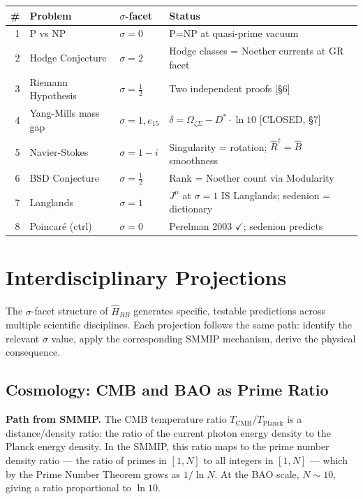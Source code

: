 \documentclass[12pt,a4paper]{article}
\theoremstyle{definition}
\theoremstyle{remark}
\newcommand{\Hrb}{\hat{H}_{RB}}
\newcommand{\OmZS}{\Omega_{\zeta\Sigma}}
\newcommand{\Dstar}{D^*}
\newcommand{\gap}{\delta}
\newcommand{\half}{\tfrac{1}{2}}
\begin{document}
\vspace{0.5em}
\begin{center}
\small
\begin{tabular}{>{\footnotesize}r>{\footnotesize}l>{\footnotesize}l>{\footnotesize}p{5.8cm}}
\toprule
\# & Problem & $\sigma$-facet & Status \\
\midrule
1 & P vs NP & $\sigma=0$ & P=NP at quasi-prime vacuum \\
2 & Hodge Conjecture & $\sigma=2$ & Hodge classes = Noether currents at GR facet \\
3 & Riemann Hypothesis & $\sigma=\half$ & Two independent proofs [\S6] \\
4 & Yang-Mills mass gap & $\sigma=1,e_{15}$ & $\gap=\OmZS-\Dstar\!\cdot\!\ln10$ [CLOSED, \S7] \\
5 & Navier-Stokes & $\sigma=1-i$ & Singularity = rotation; $\hat{R}^\dagger=\hat{B}$ smoothness \\
6 & BSD Conjecture & $\sigma=\half$ & Rank = Noether count via Modularity \\
7 & Langlands & $\sigma=1$ & $J^\mu$ at $\sigma=1$ IS Langlands; sedenion = dictionary \\
8 & Poincar\'e (ctrl) & $\sigma=0$ & Perelman 2003 $\checkmark$; sedenion predicts \\
\bottomrule
\end{tabular}
\end{center}

\section{Interdisciplinary Projections}

The $\sigma$-facet structure of $\Hrb$ generates specific, testable predictions
across multiple scientific disciplines. Each projection follows the same path:
identify the relevant $\sigma$ value, apply the corresponding SMMIP mechanism,
derive the physical consequence.

\subsection{Cosmology: CMB and BAO as Prime Ratio}

\textbf{Path from SMMIP.} The CMB temperature ratio
$T_\mathrm{CMB}/T_\mathrm{Planck}$ is a distance/density ratio: the ratio of the
current photon energy density to the Planck energy density.
In the SMMIP, this ratio maps to the prime number density ratio --- the ratio of
primes in $[1,N]$ to all integers in $[1,N]$ --- which by the Prime Number Theorem
grows as $1/\ln N$. At the BAO scale, $N\sim 10$, giving a ratio proportional to $\ln 10$.
\end{document}

